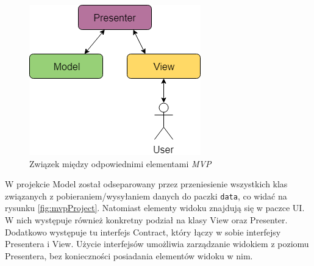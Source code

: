 \documentclass[twoside]{projektInzynierskiMS}
\begin{document}
\begin{figure}[h]
  \centering
  \includegraphics[width=0.5\linewidth]{img/android/mvp.png}
  \caption{Związek między odpowiednimi elementami \textit{MVP}}
  \label{fig:mvp}
\end{figure}

W projekcie Model został odseparowany przez przeniesienie wszystkich klas związanych z pobieraniem/wysyłaniem danych do paczki \verb`data`, co widać na rysunku \ref{fig:mvpProject}. Natomiast elementy widoku znajdują się w paczce UI. W nich występuje również konkretny podział na klasy View oraz Presenter. Dodatkowo występuje tu interfejs Contract, który łączy w sobie interfejsy Presentera i View. Użycie interfejsów umożliwia zarządzanie widokiem z poziomu Presentera, bez konieczności posiadania elementów widoku w nim. 
\end{document}
